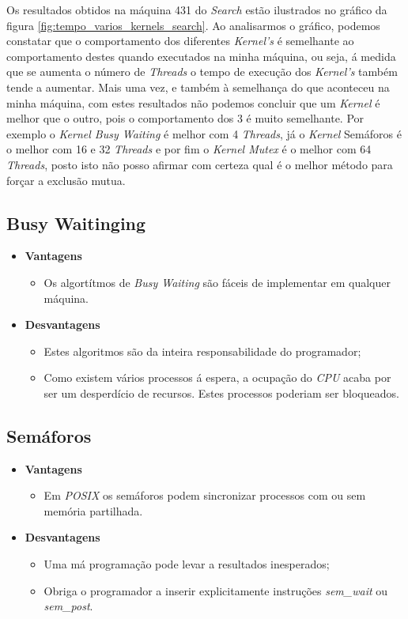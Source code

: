 \documentclass[conference,compsoc]{IEEEtran}
\begin{document}
Os resultados obtidos na máquina 431 do \textit{Search} estão ilustrados no gráfico da figura \ref{fig:tempo_varios_kernels_search}. Ao analisarmos o gráfico, podemos constatar que o comportamento dos diferentes \textit{Kernel's} é semelhante ao comportamento destes quando executados na minha máquina, ou seja, á medida que se aumenta o número de \textit{Threads} o tempo de execução dos \textit{Kernel's} também tende a aumentar. Mais uma vez, e também à semelhança do que aconteceu na minha máquina, com estes resultados não podemos concluir que um \textit{Kernel} é melhor que o outro, pois o comportamento dos 3 é muito semelhante. Por exemplo o \textit{Kernel Busy Waiting} é melhor com 4 \textit{Threads}, já o \textit{Kernel} Semáforos é o melhor com 16 e 32 \textit{Threads} e por fim o \textit{Kernel Mutex} é o melhor com 64 \textit{Threads}, posto isto não posso afirmar com certeza qual é o melhor método para forçar a exclusão mutua. 

\subsection{Busy Waitinging}

\begin{itemize}
\item \textbf{Vantagens}
\begin{itemize}
\item Os algortítmos de \textit{Busy Waiting} são fáceis de implementar em qualquer máquina.
\end{itemize}
\item \textbf{Desvantagens}
\begin{itemize}
\item Estes algoritmos são da inteira responsabilidade do programador;
\item Como existem vários processos á espera, a ocupação do \textit{CPU} acaba por ser um desperdício de recursos. Estes processos poderiam ser bloqueados.
\end{itemize}
\end{itemize}

\subsection{Semáforos}
\begin{itemize}
\item \textbf{Vantagens}
\begin{itemize}
\item Em \textit{POSIX} os semáforos podem sincronizar processos com ou sem memória partilhada.
\end{itemize}
\item \textbf{Desvantagens}
\begin{itemize}
\item Uma má programação pode levar a resultados inesperados;
\item Obriga o programador a inserir explicitamente instruções \textit{sem\_wait} ou \textit{sem\_post}.
\end{itemize}
\end{itemize}
\end{document}
